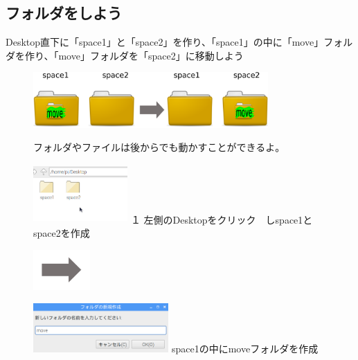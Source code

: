 \documentclass[a4paper,12pt]{jarticle}
\begin{document}
\subsection{\theExercise フォルダをしよう}
Desktop直下に「space1」と「space2」を作り、「space1」の中に「move」フォルダを作り、「move」フォルダを「space2」に移動しよう



\begin{figure}[ht]
  \centering
  \includegraphics[width=0.8\textwidth]{fig15-1.eps}
  \begin{minipage}{15.297cm}
    フォルダやファイルは後からでも動かすことができるよ。
  \end{minipage}

  \begin{minipage}{5.963cm}
    \includegraphics[width=3.604cm,height=2.268cm]{textbook-img051.png}
    {\flushleft
      １
      左側のDesktopをクリック　しspace1とspace2を作成
    }
  \end{minipage}
  \includegraphics[width=2.168cm,height=1.542cm]{textbook-img052.png}
  \begin{minipage}{7.473cm}
    \includegraphics[width=5.166cm,height=1.882cm]{textbook-img050.png}
    { space1の中にmoveフォルダを作成
    }
  \end{minipage}


\end{figure}
\end{document}

